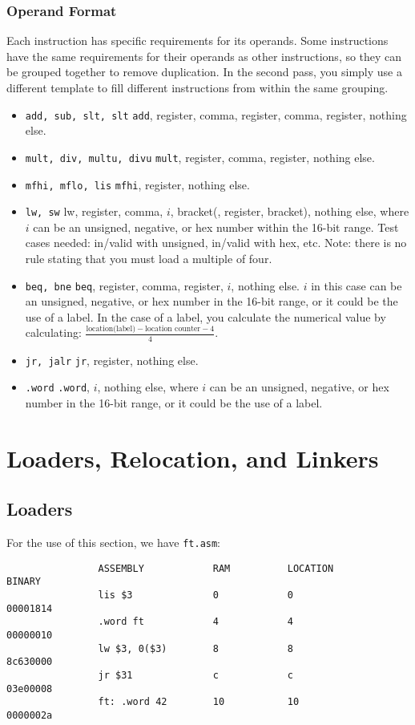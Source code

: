 \documentclass[]{article}
\theoremstyle{definition}
\newcommand{\lecture}[1]{\marginpar{{\footnotesize $\leftarrow$ \underline{#1}}}}
\begin{document}
			\subsubsection{Operand Format}
				Each instruction has specific requirements for its operands. Some instructions have the same requirements for their operands as other instructions, so they can be grouped together to remove duplication. In the second pass, you simply use a different template to fill different instructions from within the same grouping.
				\begin{itemize}
					\item \verb+add, sub, slt, slt+ \textendash{} \verb+add+, register, comma, register, comma, register, nothing else.
					\item \verb+mult, div, multu, divu+ \textendash{} \verb+mult+, register, comma, register, nothing else.
					\item \verb+mfhi, mflo, lis+ \textendash{} \verb+mfhi+, register, nothing else.
					\item \verb+lw, sw+ \textendash{} lw, register, comma, $i$, bracket(, register, bracket), nothing else, where $i$ can be an unsigned, negative, or hex number within the 16-bit range. Test cases needed: in/valid with unsigned, in/valid with hex, etc. Note: there is no rule stating that you must load a multiple of four.
					\item  \verb+beq, bne+ \textendash{} \verb+beq+, register, comma, register, $i$, nothing else. $i$ in this case can be an unsigned, negative, or hex number in the 16-bit range, or it could be the use of a label. In the case of a label, you calculate the numerical value by calculating: $\frac{\text{location(label)} - \text{location counter} - 4}{4}$.
					\item \verb+jr, jalr+ \textendash{} \verb+jr+, register, nothing else.
					\item \verb+.word+ \textendash{} \verb+.word+, $i$, nothing else, where $i$ can be an unsigned, negative, or hex number in the 16-bit range, or it could be the use of a label. 
				\end{itemize}
	\section{Loaders, Relocation, and Linkers} \lecture{January 28, 2013}
		\subsection{Loaders}
			For the use of this section, we have \verb+ft.asm+:
			\begin{verbatim}
				ASSEMBLY            RAM          LOCATION          BINARY
				lis $3              0            0                 00001814
				.word ft            4            4                 00000010
				lw $3, 0($3)        8            8                 8c630000
				jr $31              c            c                 03e00008
				ft: .word 42        10           10                0000002a
			\end{verbatim}
\end{document}
